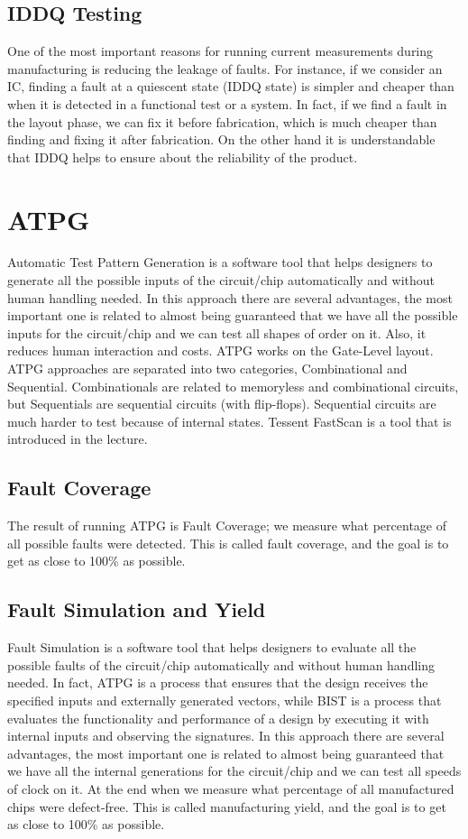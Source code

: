 \documentclass[12pt, a4paper, twocolumn]{article}
\begin{document}
\subsection{IDDQ Testing}
One of the most important reasons for running current measurements during manufacturing is reducing the leakage of faults.
For instance, if we consider an IC, finding a fault at a quiescent state (IDDQ state) is simpler and cheaper than when it is detected in a functional test or a system.
In fact, if we find a fault in the layout phase, we can fix it before fabrication, which is much cheaper than finding and fixing it after fabrication.
On the other hand it is understandable that IDDQ helps to ensure about the reliability of the product.

\section{ATPG}
Automatic Test Pattern Generation is a software tool that helps designers to generate all the possible inputs of the circuit/chip automatically and without human handling needed.
In this approach there are several advantages, the most important one is related to almost being guaranteed that we have all the possible inputs for the circuit/chip and we can test all shapes of order on it.
Also, it reduces human interaction and costs.
ATPG works on the Gate-Level layout.
ATPG approaches are separated into two categories, Combinational and Sequential.
Combinationals are related to memoryless and combinational circuits, but Sequentials are sequential circuits (with flip-flops).
Sequential circuits are much harder to test because of internal states.
Tessent FastScan is a tool that is introduced in the lecture.

\subsection{Fault Coverage}
The result of running ATPG is Fault Coverage;
we measure what percentage of all possible faults were detected.
This is called fault coverage, and the goal is to get as close to 100\% as possible.

\subsection{Fault Simulation and Yield}
Fault Simulation is a software tool that helps designers to evaluate all the possible faults of the circuit/chip automatically and without human handling needed.
In fact, ATPG is a process that ensures that the design receives the specified inputs and externally generated vectors, while BIST is a process that evaluates the functionality and performance of a design by executing it with internal inputs and observing the signatures.
In this approach there are several advantages, the most important one is related to almost being guaranteed that we have all the internal generations for the circuit/chip and we can test all speeds of clock on it.
At the end when we measure what percentage of all manufactured chips were defect-free.
This is called manufacturing yield, and the goal is to get as close to 100\% as possible.
\end{document}
